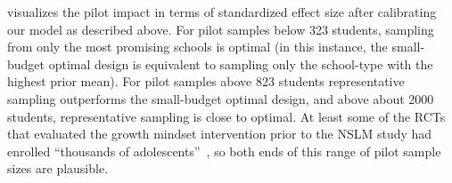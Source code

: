  visualizes the pilot impact in terms of standardized effect size after calibrating our model as described above.
For pilot samples below 323 students, sampling from only the most promising schools is optimal (in this instance, the small-budget optimal design is equivalent to sampling only the school-type with the highest prior mean).
For pilot samples above 823 students representative sampling outperforms the small-budget optimal design, and above about 2000 students, representative sampling is close to optimal.
At least some of the RCTs that evaluated the growth mindset intervention prior to the NSLM study had enrolled ``thousands of adolescents''~\cite{YeagerHa19}, so both ends of this range of pilot sample sizes are plausible.
